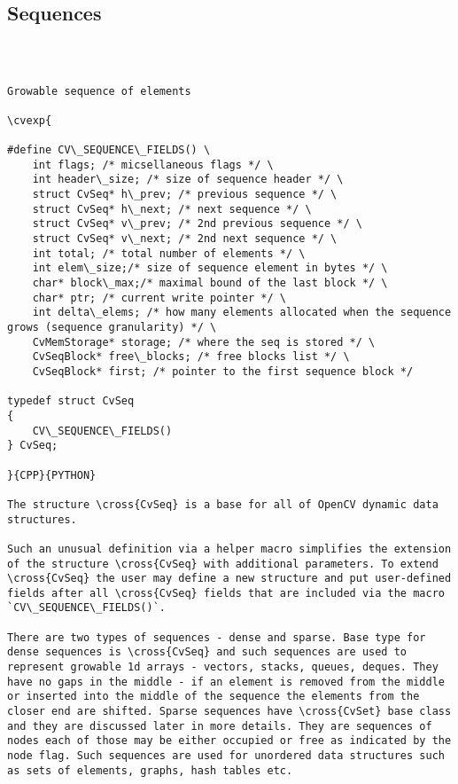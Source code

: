 \subsection{Sequences}
\begin{verbatim}


\end{verbatim}
\label{CvSeq}
\begin{verbatim}

Growable sequence of elements

\cvexp{

#define CV\_SEQUENCE\_FIELDS() \
    int flags; /* micsellaneous flags */ \
    int header\_size; /* size of sequence header */ \
    struct CvSeq* h\_prev; /* previous sequence */ \
    struct CvSeq* h\_next; /* next sequence */ \
    struct CvSeq* v\_prev; /* 2nd previous sequence */ \
    struct CvSeq* v\_next; /* 2nd next sequence */ \
    int total; /* total number of elements */ \
    int elem\_size;/* size of sequence element in bytes */ \
    char* block\_max;/* maximal bound of the last block */ \
    char* ptr; /* current write pointer */ \
    int delta\_elems; /* how many elements allocated when the sequence grows (sequence granularity) */ \
    CvMemStorage* storage; /* where the seq is stored */ \
    CvSeqBlock* free\_blocks; /* free blocks list */ \
    CvSeqBlock* first; /* pointer to the first sequence block */

typedef struct CvSeq
{
    CV\_SEQUENCE\_FIELDS()
} CvSeq;

}{CPP}{PYTHON}

The structure \cross{CvSeq} is a base for all of OpenCV dynamic data structures.

Such an unusual definition via a helper macro simplifies the extension of the structure \cross{CvSeq} with additional parameters. To extend \cross{CvSeq} the user may define a new structure and put user-defined fields after all \cross{CvSeq} fields that are included via the macro `CV\_SEQUENCE\_FIELDS()`.

There are two types of sequences - dense and sparse. Base type for dense sequences is \cross{CvSeq} and such sequences are used to represent growable 1d arrays - vectors, stacks, queues, deques. They have no gaps in the middle - if an element is removed from the middle or inserted into the middle of the sequence the elements from the closer end are shifted. Sparse sequences have \cross{CvSet} base class and they are discussed later in more details. They are sequences of nodes each of those may be either occupied or free as indicated by the node flag. Such sequences are used for unordered data structures such as sets of elements, graphs, hash tables etc.


\end{verbatim}
